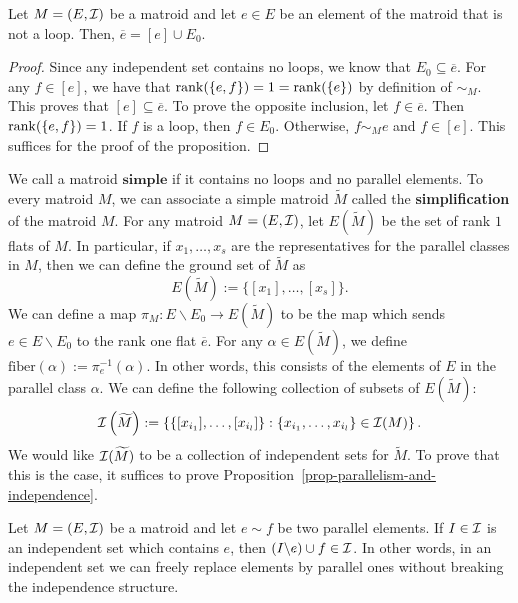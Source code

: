 \documentclass{puthesis-UG}
\begin{document}
\begin{prop} \label{characterization-of-atoms-of-flats}
	Let $M = (E, \mathcal{I})$ be a matroid and let $e \in E$ be an element of the matroid that is not a loop. Then, $\overline{e} = [e] \cup E_0$.
\end{prop}

\begin{proof}
	Since any independent set contains no loops, we know that $E_0 \subseteq \overline{e}$. For any $f \in [e]$, we have that $\operatorname{rank} (\{e, f\}) = 1 = \operatorname{rank} (\{e\})$ by definition of $\sim_M$. This proves that $[e] \subseteq \overline{e}$. To prove the opposite inclusion, let $f \in \overline{e}$. Then $\operatorname{rank}(\{e, f\}) = 1$. If $f$ is a loop, then $f \in E_0$. Otherwise, $f \sim_M e$ and $f \in [e]$. This suffices for the proof of the proposition. 
\end{proof}

We call a matroid $\textbf{simple}$ if it contains no loops and no parallel elements. To every matroid $M$, we can associate a simple matroid $\widetilde{M}$ called the \textbf{simplification} of the matroid $M$. For any matroid $M = (E, \mathcal{I})$, let $E(\widetilde{M})$ be the set of rank $1$ flats of $M$. In particular, if $x_1, \ldots, x_s$ are the representatives for the parallel classes in $M$, then we can define the ground set of $\widetilde{M}$ as 
\[
	E \left ( \widetilde{M} \right ) := \{[x_1], \ldots, [x_s]\}.	
\] 
We can define a map $\pi_M : E \backslash E_0 \to E(\widetilde{M})$ to be the map which sends $e \in E \backslash E_0$ to the rank one flat $\overline{e}$. For any $\alpha \in E(\widetilde{M})$, we define $\text{fiber}(\alpha) := \pi_e^{-1}(\alpha)$. In other words, this consists of the elements of $E$ in the parallel class $\alpha$. We can define the following collection of subsets of $E(\widetilde{M})$:
\[
	\mathcal{I} \left ( \widetilde{M} \right ) := \left \{ \{[x_{i_1}], \ldots, [x_{i_l}] \} : \{x_{i_1}, \ldots, x_{i_l}\} \in \mathcal{I}(M) \right \}.
\]
We would like $\mathcal{I}(\widetilde{M})$ to be a collection of independent sets for $\widetilde{M}$. To prove that this is the case, it suffices to prove Proposition~\ref{prop-parallelism-and-independence}. 

\begin{prop} \label{prop-parallelism-and-independence}
	Let $M = (E, \mathcal{I})$ be a matroid and let $e \sim f$ be two parallel elements. If $I \in \mathcal{I}$ is an independent set which contains $e$, then $(I \backslash e) \cup f \in \mathcal{I}$. In other words, in an independent set we can freely replace elements by parallel ones without breaking the independence structure. 
\end{prop}
\end{document}
